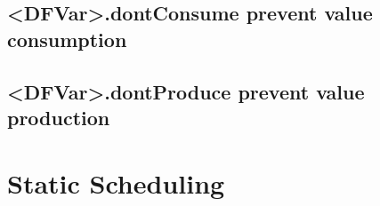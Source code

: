 \section{<DFVar>.dontConsume prevent value consumption}
\section{<DFVar>.dontProduce prevent value production}





\chapter{Static Scheduling}
